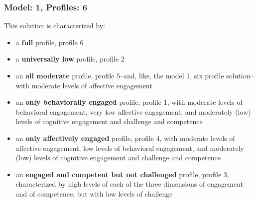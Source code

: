 \documentclass[]{msu-thesis}
\providecommand{\tightlist}{%
  \setlength{\itemsep}{0pt}\setlength{\parskip}{0pt}}
\theoremstyle{definition}
\theoremstyle{definition}
\theoremstyle{definition}
\theoremstyle{remark}
\begin{document}
\subsubsection{Model: 1, Profiles: 6}\label{model-1-profiles-6}

This solution is characterized by:

\begin{itemize}
\tightlist
\item
  a \textbf{full} profile, profile 6
\item
  a \textbf{universally low} profile, profile 2
\item
  an \textbf{all moderate} profile, profile 5--and, like, the model 1,
  six profile solution--with moderate levels of affective engagement
\item
  an \textbf{only behaviorally engaged} profile, profile 1, with
  moderate levels of behavioral engagement, very low affective
  engagement, and moderately (low) levels of cognitive engagement and
  challenge and competence
\item
  an \textbf{only affectively engaged} profile, profile 4, with moderate
  levels of affective engagement, low levels of behavioral engagement,
  and moderately (low) levels of cognitive engagement and challenge and
  competence
\item
  an \textbf{engaged and competent but not challenged} profile, profile
  3, characterized by high levels of each of the three dimensions of
  engagement and of competence, but with low levels of challenge
\end{itemize}
\end{document}
